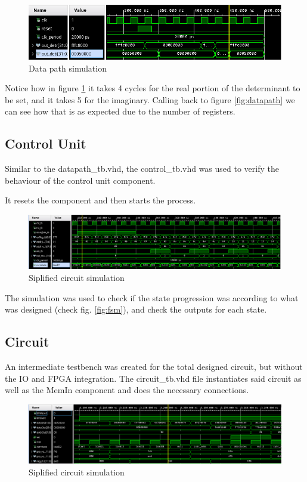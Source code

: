 \documentclass[12pt]{article}
\begin{document}
\begin{figure}[!htp]
	\centering
	\includegraphics[width=0.5\linewidth]{images/simDataPath.png}
	\caption{Data path simulation}
	\label{fig:simData}
\end{figure}

Notice how in figure \ref{fig:simData} it takes 4 cycles for the real portion of the determinant to be set, and it takes 5 for the imaginary. Calling back to figure \ref{fig:datapath} we can see how that is as expected due to the number of registers.

\subsection{Control Unit}
Similar to the datapath\_tb.vhd, the control\_tb.vhd was used to verify the behaviour of the control unit component.

It resets the component and then starts the process. 

\begin{figure}[!htp]
	\centering
	\includegraphics[width=0.7\linewidth]{images/simControl.png}
	\caption{Siplified circuit simulation}
	\label{fig:simContro}
\end{figure}

The simulation was used to check if the state progression was according to what was designed (check fig. \ref{fig:fsm}), and check the outputs for each state.

\subsection{Circuit}
An intermediate testbench was created for the total designed circuit, but without the IO and FPGA integration.
The circuit\_tb.vhd file instantiates said circuit as well as the MemIn component and does the necessary connections.

\begin{figure}[!htp]
	\centering
	\includegraphics[width=0.7\linewidth]{images/simCircuit.png}
	\caption{Siplified circuit simulation}
	\label{fig:simCircuit}
\end{figure}
\end{document}
